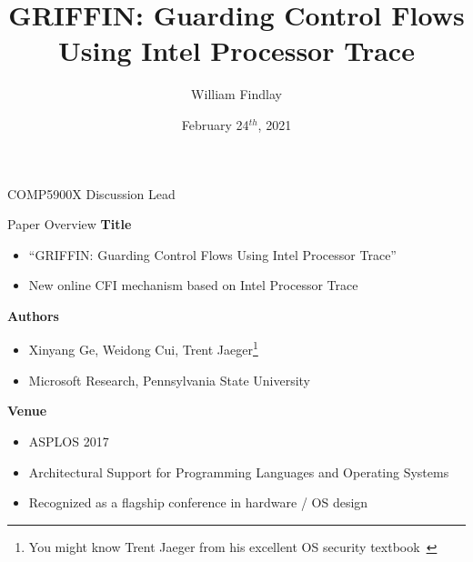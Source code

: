 \documentclass[12pt, dvipsnames, aspectratio=169]{beamer}
\date{February 24$^{th}$, 2021}
\title{GRIFFIN\@: Guarding Control Flows Using Intel Processor Trace}
\author{William Findlay}
\institute{Carleton University\\\href{mailto:will@ccsl.carleton.ca}{\ttfamily will@ccsl.carleton.ca}}
\begin{document}

\begin{frame}
  \titlepage%
  \vfill
  \vspace{4em}
  {\footnotesize COMP5900X Discussion Lead}
\end{frame}

%

\begin{frame}[c]{Paper Overview}{}
  {\bf Title}
  \begin{itemize}
    \item \enquote{GRIFFIN\@: Guarding Control Flows Using Intel Processor Trace}
    \item New online CFI mechanism based on Intel Processor Trace
  \end{itemize}

  \vfill
  {\bf Authors}
  \begin{itemize}
    \item Xinyang Ge, Weidong Cui, Trent Jaeger\footnote{You might know Trent Jaeger from his excellent OS security textbook~\cite{jaeger2008_os_security}}
    \item Microsoft Research, Pennsylvania State University
  \end{itemize}

  \vfill
  {\bf Venue}
  \begin{itemize}
    \item ASPLOS 2017
    \item Architectural Support for Programming Languages and Operating Systems
    \item Recognized as a flagship conference in hardware / OS design
  \end{itemize}
\end{frame}
\end{document}
